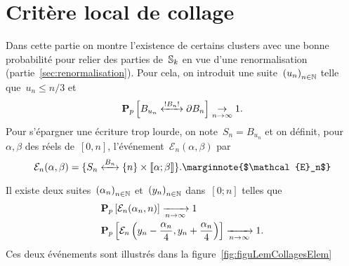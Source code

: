 \section{Critère local de collage}
Dans cette partie on montre l'existence de certains clusters avec une bonne probabilité pour relier des parties de~$\mathbb{S}_k$ en vue d'une renormalisation (partie~\ref{sec:renormalisation}). Pour cela, on introduit une suite~$\suite{u}$ telle que~$u_n \leqslant n/3$ et %
	\begin{equation}\label{eq:toucherBordCarre}
		\Pp{\relie*[B_n]{B_{u_n}}{\partial B_n}} \underset{n \to \infty}{\to} 1. 
	\end{equation}
	Pour s'épargner une écriture trop lourde, on note~$S_n = B_{u_n}$  et on définit, pour~$\alpha, \beta$ des réels de~$[0, n]$, l'événement~$\mathcal{E}_n(\alpha, \beta)$ par
	\[
		\mathcal{E}_n( \alpha, \beta ) = \{\relie[B_n]{S_n}{\{n\} \times \llbracket \alpha ; \beta \rrbracket} \}. \marginnote{$\mathcal{E}_n$}
	\]
	
	\begin{lem}\label{lem:collagesElem} 
		Il existe deux suites~$\suite{\alpha}$ et~$\suite{y}$ dans~$[0; n]$ telles que
		\begin{align*}
			  &\bm{\mathrm{P}}_{p}\left[\mathcal{E}_n(\alpha_n, n)\right] \xrightarrow[n\to\infty]{} 1 \\ 
			  &\bm{\mathrm{P}}_{p}\left[\mathcal{E}_n\left(y_n - \frac{\alpha_n}{4}, y_n + \frac{\alpha_n}{4}\right)\right] \xrightarrow[n \to \infty]{} 1.
		\end{align*}
		Ces deux événements sont illustrés dans la figure~\ref{fig:figuLemCollagesElem}
	\end{lem}
	
